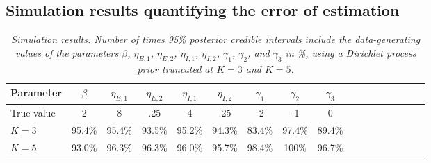 \documentclass[12pt,usenatbib,referee]{article}
\begin{document}
\subsection{Simulation results quantifying the error of estimation}
\label{sim.recovery}

\vspace{-.5cm}

\begin{table}[h]
\caption{\label{simulation.recovery}
{\normalsize\em Simulation results. 
Number of times 95\% posterior credible intervals include the data-generating values of the parameters $\beta$, $\eta_{E,1}$, $\eta_{E,2}$, $\eta_{I,1}$, $\eta_{I,2}$, $\gamma_1$, $\gamma_2$, and $\gamma_3$ in \%, 
using a Dirichlet process prior truncated at $K = 3$ and $K = 5$.}}\s
\begin{minipage}{6in}
\begin{center}
\begin{tabular}{lcccccccccccccccc}
        Parameter                   & $\beta$               & $\eta_{E,1}$         & $\eta_{E,2}$    &       $\eta_{I,1}$   & $\eta_{I,2}$    & $\gamma_1$            & $\gamma_2$            &       $\gamma_3$ \\[0.5ex]
        \hline
        True value                           &  2                    &       8       &       .25            &       4               &       .25            &       -2                      &       -1                      &       0\\
        \hline
        $K = 3$      &  95.4\%               &  95.4\%       &       93.5\%  &       95.2\%  &       94.3\%  &       83.4\%          &       97.4\%          &       89.4\%\\
        \hline
        $K = 5$     &  93.0\%               & 96.3\%        &       96.3\%  &       96.0\%  &       95.7\%  &       98.4\%          &       100\%           &       96.7\%\\
        \hline
\end{tabular}
\end{center}
\end{minipage}
\end{table}

\hide{






}
\end{document}
